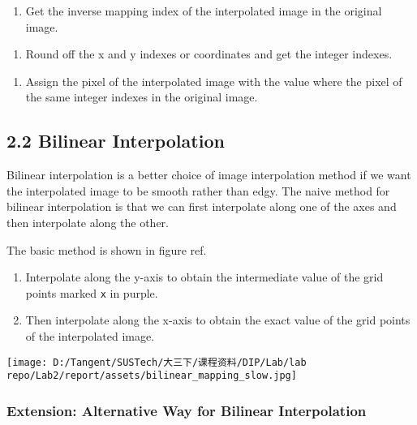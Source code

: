 \documentclass[
]{article}
\begin{document}
\begin{enumerate}
\def\labelenumi{\arabic{enumi}.}
\item
  Get the inverse mapping index of the interpolated image in the
  original image.
\end{enumerate}

\begin{enumerate}
\def\labelenumi{\arabic{enumi}.}
\item
  Round off the x and y indexes or coordinates and get the integer
  indexes.
\end{enumerate}

\begin{enumerate}
\def\labelenumi{\arabic{enumi}.}
\item
  Assign the pixel of the interpolated image with the value where the
  pixel of the same integer indexes in the original image.
\end{enumerate}

\hypertarget{22-bilinear-interpolation}{%
\subsection{2.2 Bilinear
Interpolation}\label{22-bilinear-interpolation}}

Bilinear interpolation is a better choice of image interpolation method
if we want the interpolated image to be smooth rather than edgy. The
naive method for bilinear interpolation is that we can first interpolate
along one of the axes and then interpolate along the other.

The basic method is shown in figure ref.

\begin{enumerate}
\def\labelenumi{\arabic{enumi}.}
\item
  Interpolate along the y-axis to obtain the intermediate value of the
  grid points marked \texttt{x} in purple.
\item
  Then interpolate along the x-axis to obtain the exact value of the
  grid points of the interpolated image.
\end{enumerate}

\texttt{[image: D:/Tangent/SUSTech/大三下/课程资料/DIP/Lab/lab repo/Lab2/report/assets/bilinear\_mapping\_slow.jpg]}

\hypertarget{extension-alternative-way-for-bilinear-interpolation}{%
\subsubsection{Extension: Alternative Way for Bilinear
Interpolation}\label{extension-alternative-way-for-bilinear-interpolation}}
\end{document}
